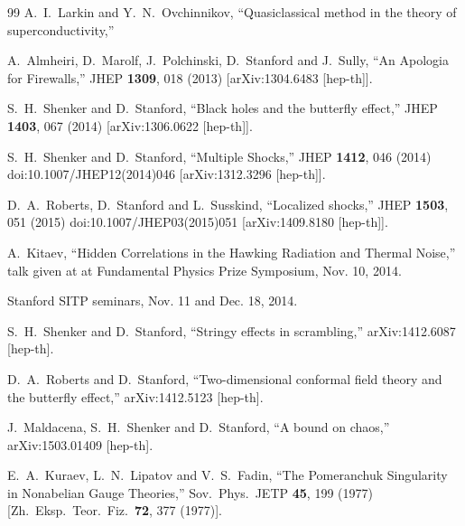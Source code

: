 \documentclass[12pt]{article}
\begin{document}
\begin{thebibliography}{99}
  A.~I.~Larkin and Y.~N.~Ovchinnikov, 
  ``Quasiclassical method in the theory of superconductivity,''
    

  A.~Almheiri, D.~Marolf, J.~Polchinski, D.~Stanford and J.~Sully,
  ``An Apologia for Firewalls,''
  JHEP {\bf 1309}, 018 (2013)
  [arXiv:1304.6483 [hep-th]].
  
  

  S.~H.~Shenker and D.~Stanford,
  ``Black holes and the butterfly effect,''
  JHEP {\bf 1403}, 067 (2014)
  [arXiv:1306.0622 [hep-th]].
  
 

  S.~H.~Shenker and D.~Stanford,
  ``Multiple Shocks,''
  JHEP {\bf 1412}, 046 (2014)
  doi:10.1007/JHEP12(2014)046
  [arXiv:1312.3296 [hep-th]].
  
  

  D.~A.~Roberts, D.~Stanford and L.~Susskind,
  ``Localized shocks,''
  JHEP {\bf 1503}, 051 (2015)
  doi:10.1007/JHEP03(2015)051
  [arXiv:1409.8180 [hep-th]].

 A.~Kitaev, ``Hidden Correlations in the Hawking Radiation and Thermal Noise,'' talk given at at Fundamental Physics Prize Symposium, Nov. 10, 2014.
 
 Stanford SITP seminars, Nov. 11 and Dec. 18, 2014.
 
 

  S.~H.~Shenker and D.~Stanford,
  ``Stringy effects in scrambling,''
  arXiv:1412.6087 [hep-th].
  

  D.~A.~Roberts and D.~Stanford,
  ``Two-dimensional conformal field theory and the butterfly effect,''
  arXiv:1412.5123 [hep-th].
  

  J.~Maldacena, S.~H.~Shenker and D.~Stanford,
  ``A bound on chaos,''
  arXiv:1503.01409 [hep-th].


  E.~A.~Kuraev, L.~N.~Lipatov and V.~S.~Fadin,
  ``The Pomeranchuk Singularity in Nonabelian Gauge Theories,''
  Sov.\ Phys.\ JETP {\bf 45}, 199 (1977)
  [Zh.\ Eksp.\ Teor.\ Fiz.\  {\bf 72}, 377 (1977)].


\end{thebibliography}
\end{document}
